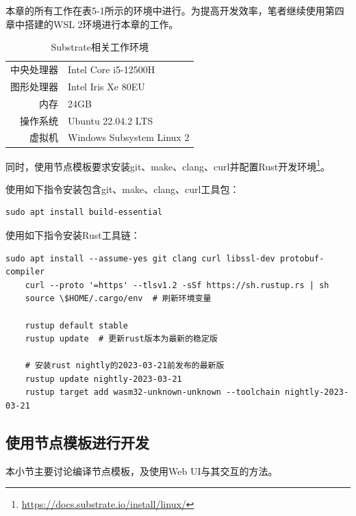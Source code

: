 本章的所有工作在表5-1所示的环境中进行。为提高开发效率，笔者继续使用第四章中搭建的WSL 2环境进行本章的工作。

\begin{table}[htbp]
    \linespread{1.5}
    \centering
    \caption{Substrate相关工作环境}\label{Substrate相关工作环境}
    \begin{tabular}{r|l} \toprule
        中央处理器 & Intel Core i5-12500H      \\
        图形处理器 & Intel Iris Xe 80EU        \\
        内存    & 24GB                      \\
        操作系统  & Ubuntu 22.04.2 LTS        \\
        虚拟机   & Windows Subsystem Linux 2 \\
        \bottomrule
    \end{tabular}
\end{table}

同时，使用节点模板要求安装git、make、clang、curl并配置Rust开发环境\footnote{\url{https://docs.substrate.io/install/linux/}}。

使用如下指令安装包含git、make、clang、curl工具包：

\begin{lstlisting}[caption={安装工具包}, label={lst:安装工具包}]
    sudo apt install build-essential
\end{lstlisting}

使用如下指令安装Rust工具链：

\begin{lstlisting}[caption={安装Rust工具链}, label={lst:安装Rust工具链}]
    sudo apt install --assume-yes git clang curl libssl-dev protobuf-compiler
    curl --proto '=https' --tlsv1.2 -sSf https://sh.rustup.rs | sh
    source \$HOME/.cargo/env  # 刷新环境变量

    rustup default stable
    rustup update  # 更新rust版本为最新的稳定版

    # 安装rust nightly的2023-03-21前发布的最新版
    rustup update nightly-2023-03-21
    rustup target add wasm32-unknown-unknown --toolchain nightly-2023-03-21
\end{lstlisting}

\subsection{使用节点模板进行开发}

本小节主要讨论编译节点模板，及使用Web UI与其交互的方法。


